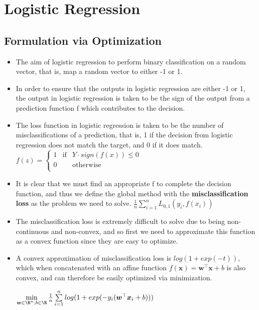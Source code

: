 \documentclass[english]{latex4ei/latex4ei_sheet}
\begin{document}
\section{Logistic Regression}
\begin{sectionbox}
\subsection{Formulation via Optimization}
\begin{itemize}
\item The aim of logistic regression to perform binary classification on a random vector, that is, map a random vector to either -1 or 1.
\item In order to ensure that the outputs in logistic regression are either -1 or 1, the output in logistic regression is taken to be the sign of the output from a prediction function f which contributes to the decision.
\item The loss function in logistic regression is taken to be the number of misclassifications of a prediction, that is, 1 if the decision from logistic regression does not match the target, and 0 if it does match.
$f(z) = \left\{ \begin{array}{rcl}
     1 & \mbox{if}
& Y\cdot sign(f(x))\leq 0 \\ 0 & & \mbox{otherwise}\\
\end{array}\right.$
\item It is clear that we must find an appropriate f  to complete the decision function, and thus we define the global method with the \textbf{misclassification loss} as the problem we need to solve.
$ \frac{1}{n}\sum\limits_{i=1}^nL_{0,1}(y_i,f(x_i))$
\item The misclassification loss is extremely difficult to solve due to being non-continuous and non-convex, and so first we need to approximate this function as a convex function since they are easy to optimize.
\item A convex approximation of misclassification loss is $log(1 + exp(-t))$, which when concatenated with  an affine function $f(\boldsymbol{x})=\boldsymbol{w^{\top}x}+b$ is also convex, and can therefore be easily optimized via minimization.\\
\begin{center}
\begin{emphbox}
    $\min\limits_{\boldsymbol{w}\in\R^n,b\in\R}\frac{1}{n}\sum\limits_{i=1}^nlog(1+exp(-y_i(\boldsymbol{w}^{\top}\boldsymbol{x}_i+b)))$

\end{emphbox}
\end{center}
\end{itemize}
\end{sectionbox}
\end{document}
